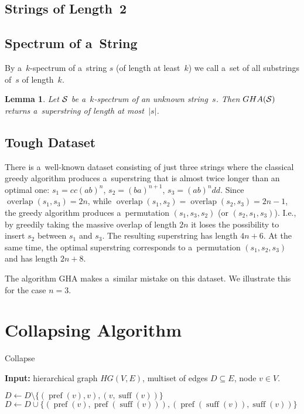 \documentclass[11pt,letterpaper]{article}
\newtheorem{lemma}{Lemma}
\DeclareMathOperator{\overlap}{overlap}
\DeclareMathOperator{\pref}{pref}
\DeclareMathOperator{\suff}{suff}
\begin{document}
\subsection{Strings of Length~2}

\subsection{Spectrum of a~String}
By a~$k$-spectrum of a~string $s$ 
(of length at least~$k$)
we call a~set of all substrings of~$s$ of length~$k$.

\begin{lemma}
Let ${\cal S}$ be a~$k$-spectrum of an unknown string~$s$. Then $GHA({\cal S})$ returns a~superstring of length at most~$|s|$. 
\end{lemma}

\subsection{Tough Dataset}
There is a~well-known dataset consisting of just three strings where the classical greedy algorithm produces a~superstring that is almost twice longer than an optimal one: $s_1=cc(ab)^n$, $s_2=(ba)^{n+1}$, $s_3=(ab)^ndd$. Since $\overlap(s_1, s_3)=2n$,
 while $\overlap(s_1,s_2)=\overlap(s_2,s_3)=2n-1$, the greedy algorithm produces a~permutation $(s_1, s_3, s_2)$ (or $(s_2,s_1,s_3)$). I.e., by greedily taking the massive overlap of length $2n$ it loses the possibility to insert $s_2$ between $s_1$ and $s_3$. The resulting superstring has length $4n+6$. At the same time, the optimal superstring corresponds to a~permutation $(s_1,s_2,s_3)$ and has length $2n+8$.
 
 The algorithm GHA makes a~similar mistake on this dataset. We illustrate this for the case $n=3$.



\section{Collapsing Algorithm}
\begin{algorithm}
\caption{Collapse}
\hspace*{\algorithmicindent} \textbf{Input:} hierarchical graph $HG(V,E)$, multiset of edges $D \subseteq E$, node $v \in V$.
\begin{algorithmic}[1]
\If{$(\pref(v), v), (v, \suff(v)) \in D$:}
\State $D \gets D \setminus \{(\pref(v), v), (v, \suff(v))\}$
\State $D \gets D \cup \{(\pref(v), \pref(\suff(v))), (\pref(\suff(v)), \suff(v))\}$
\EndIf
\EndIf
\end{algorithmic}
\end{algorithm}
\end{document}

